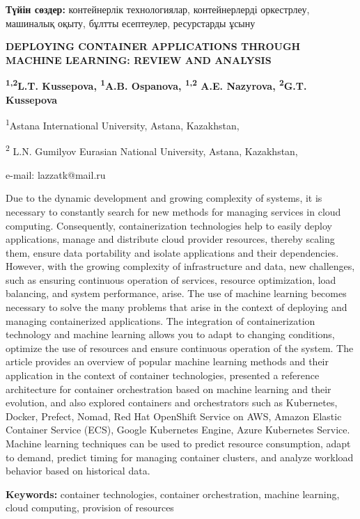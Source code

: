 {\bfseries Түйін сөздер:} контейнерлік технологиялар, контейнерлерді
оркестрлеу, машиналық оқыту, бұлтты есептеулер, ресурстарды ұсыну

\begin{center}
{\large\bfseries DEPLOYING CONTAINER APPLICATIONS THROUGH MACHINE LEARNING:
REVIEW AND ANALYSIS}

{\bfseries \textsuperscript{1,2}L.T. Kussepova, \textsuperscript{1}A.B.
Ospanova, \textsuperscript{1,2} A.E. Nazyrova, \textsuperscript{2}G.T.
Kussepova}

\textsuperscript{1}Astana International University, Astana, Kazakhstan,

\textsuperscript{2} L.N. Gumilyov Eurasian National University, Astana,
Kazakhstan,

e-mail: lazzatk@mail.ru
\end{center}

Due to the dynamic development and growing complexity of systems, it is
necessary to constantly search for new methods for managing services in
cloud computing. Consequently, containerization technologies help to
easily deploy applications, manage and distribute cloud provider
resources, thereby scaling them, ensure data portability and isolate
applications and their dependencies. However, with the growing
complexity of infrastructure and data, new challenges, such as ensuring
continuous operation of services, resource optimization, load balancing,
and system performance, arise. The use of machine learning becomes
necessary to solve the many problems that arise in the context of
deploying and managing containerized applications. The integration of
containerization technology and machine learning allows you to adapt to
changing conditions, optimize the use of resources and ensure continuous
operation of the system. The article provides an overview of popular
machine learning methods and their application in the context of
container technologies, presented a reference architecture for container
orchestration based on machine learning and their evolution, and also
explored containers and orchestrators such as Kubernetes, Docker,
Prefect, Nomad, Red Hat OpenShift Service on AWS, Amazon Elastic
Container Service (ECS), Google Kubernetes Engine, Azure Kubernetes
Service. Machine learning techniques can be used to predict resource
consumption, adapt to demand, predict timing for managing container
clusters, and analyze workload behavior based on historical data.

{\bfseries Keywords:} container technologies, container orchestration,
machine learning, cloud computing, provision of resources

